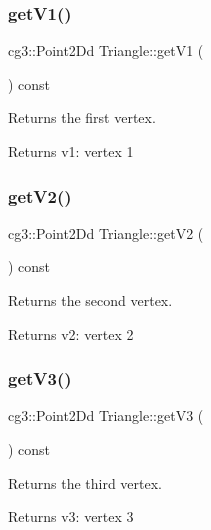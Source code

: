 \subsubsection{\texorpdfstring{get\+V1()}{getV1()}}
{\footnotesize\ttfamily cg3\+::\+Point2\+Dd Triangle\+::get\+V1 (\begin{DoxyParamCaption}{ }\end{DoxyParamCaption}) const}



Returns the first vertex. 

\begin{DoxyReturn}{Returns}
v1\+: vertex 1 
\end{DoxyReturn}
\mbox{\label{classTriangle_a6b22d833c2cc9b738793da637642bfd0}} 
\subsubsection{\texorpdfstring{get\+V2()}{getV2()}}
{\footnotesize\ttfamily cg3\+::\+Point2\+Dd Triangle\+::get\+V2 (\begin{DoxyParamCaption}{ }\end{DoxyParamCaption}) const}



Returns the second vertex. 

\begin{DoxyReturn}{Returns}
v2\+: vertex 2 
\end{DoxyReturn}
\mbox{\label{classTriangle_ad63dee82c3268c96bb5a6d353675c133}} 
\subsubsection{\texorpdfstring{get\+V3()}{getV3()}}
{\footnotesize\ttfamily cg3\+::\+Point2\+Dd Triangle\+::get\+V3 (\begin{DoxyParamCaption}{ }\end{DoxyParamCaption}) const}



Returns the third vertex. 

\begin{DoxyReturn}{Returns}
v3\+: vertex 3 
\end{DoxyReturn}
\mbox{\label{classTriangle_a5769869c3384056f58410395ccd1a979}} 

